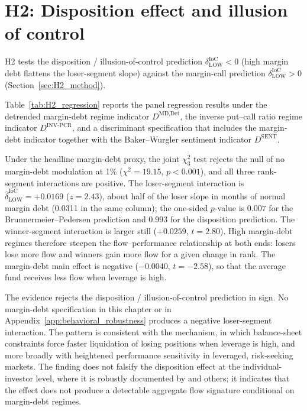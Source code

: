 \documentclass[12pt, oneside]{report}
\begin{document}
\section{H2: Disposition effect and illusion of control}
\label{sec:H2}

H2 tests the disposition / illusion-of-control prediction
$\delta^{\text{IoC}}_{\text{LOW}} < 0$ (high margin debt flattens the
loser-segment slope) against the \textcite{BrunnermeierPedersen2009}
margin-call prediction $\delta^{\text{IoC}}_{\text{LOW}} > 0$
(Section~\ref{sec:H2_method}).

\noindent Table~\ref{tab:H2_regression} reports the panel regression
results under the detrended margin-debt regime indicator
$D^{\text{MD,Det}}$, the inverse put--call ratio regime indicator
$D^{\text{INV-PCR}}$, and a discriminant specification that includes the
margin-debt indicator together with the Baker--Wurgler sentiment
indicator $D^{\text{SENT}}$.



Under the headline margin-debt proxy, the joint $\chi^2_3$ test rejects
the null of no margin-debt modulation at 1\% ($\chi^2 = 19.15$,
$p < 0.001$), and all three rank-segment interactions are positive. The
loser-segment interaction is $\hat{\delta}^{\text{IoC}}_{\text{LOW}} =
+0.0169$ ($z = 2.43$), about half of the loser slope in months of
normal margin debt (0.0311 in the same column); the
one-sided $p$-value is $0.007$ for the Brunnermeier--Pedersen prediction
and $0.993$ for the disposition prediction. The winner-segment
interaction is larger still ($+0.0259$, $t = 2.80$). High margin-debt
regimes therefore steepen the flow--performance relationship at
both ends: losers lose more flow and winners gain more flow for a given
change in rank. The margin-debt main effect is negative ($-0.0040$,
$t = -2.58$), so that the average fund receives less flow when leverage
is high.

The evidence rejects the disposition / illusion-of-control prediction in
sign. No margin-debt specification in this chapter or in
Appendix~\ref{app:behavioral_robustness} produces a negative
loser-segment interaction. The pattern is consistent with the
\textcite{BrunnermeierPedersen2009} mechanism, in which balance-sheet
constraints force faster liquidation of losing positions when leverage is
high, and more broadly with heightened performance sensitivity in
leveraged, risk-seeking markets. The finding does not falsify the
disposition effect at the individual-investor level, where it is robustly
documented by \textcite{Odean1998} and others; it indicates that the
effect does not produce a detectable aggregate flow signature
conditional on margin-debt regimes.
\end{document}
